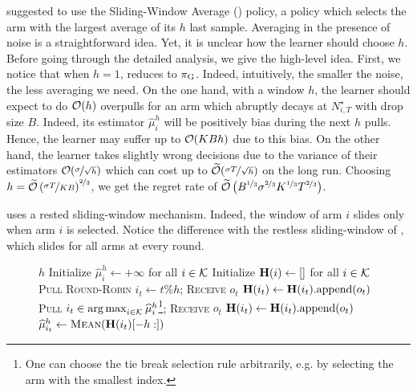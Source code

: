 \citet{levine2017rotting} suggested to use the Sliding-Window Average (\SWA) policy, a policy which selects the arm with the largest average of its $h$ last sample. Averaging in the presence of noise is a straightforward idea. Yet, it is unclear how the learner should choose $h$. Before going through the detailed analysis, we give the high-level idea. First, we notice that when $h=1$, \SWA reduces to $\pi_{\rm G}$. Indeed, intuitively, the smaller the noise, the less averaging we need. On the one hand, with a window $h$, the learner should expect to do $\mathcal{O}(h)$ overpulls for an arm which abruptly decays at $N_{i,T}^\star$ with drop size $B$. Indeed, its estimator $\hat{\mu}_i^h$ will be positively bias during the next $h$ pulls. Hence, the learner may suffer up to $\mathcal{O}(KBh)$ due to this bias. On the other hand, the learner takes slightly wrong decisions due to the variance of their estimators $\mathcal{O}(\nicefrac{\sigma}{\sqrt{h}})$ which can cost up to $\widetilde{\mathcal{O}}(\nicefrac{\sigma T}{\sqrt{h}})$ on the long run. Choosing $h = \widetilde{\mathcal{O}}\left(\nicefrac{ \sigma T}{KB}\right)^{\nicefrac{2}{3}}$, we get the regret rate of $\widetilde{\mathcal{O}}\left(B^{\nicefrac{1}{3}} \sigma^{\nicefrac{2}{3}} K^{\nicefrac{1}{3}} T^{\nicefrac{2}{3}}\right)$. 
\begin{remark}
\SWA uses a rested sliding-window mechanism. Indeed, the window of arm $i$ slides only when arm $i$ is selected. Notice the difference with the restless sliding-window of \SWUCB \citep{garivier2011upper-confidence-bound}, which slides for all arms at every round.
\end{remark}
\begin{figure}[!ht]
\begin{minipage}{\textwidth}
\renewcommand*\footnoterule{}
\begin{savenotes}
\begin{algorithm}[H]
\caption{\SWA \citep{levine2017rotting} }
\label{alg:SWA}
\begin{algorithmic}[1]
\Require $h$
\State Initialize $\hat{\mu}_{i}^h \leftarrow + \infty$ for all $i \in \mathcal{K}$
\State Initialize $\mathbf{H}(i) \leftarrow []$ for all $i \in \mathcal{K}$
	 	\State \textsc{Pull Round-Robin}  $i_t \gets t \% h $; \textsc{Receive} $o_{t}$
	 	\State $\mathbf{H}(i_t) \leftarrow \mathbf{H}(i_t)\text{.append}(o_{t})$
	\EndFor
		\State \textsc{Pull}  $i_t \in \operatorname*{arg\,max}_{i \in \mathcal{K}} \widehat{\mu}_{i}^h$\footnote{One can choose the tie break selection rule arbitrarily, e.g. by selecting the arm with the smallest index.}; \textsc{Receive} $o_{t}$
		\State $\mathbf{H}(i_t) \leftarrow \mathbf{H}(i_t)\text{.append}(o_{t})$
		\State $\widehat{\mu}_{i_t}^h \leftarrow \textsc{Mean}(\mathbf{H}(i_t)[-h:])$
		\EndIf
	\EndFor
\end{algorithmic}
\end{algorithm}
\end{savenotes}
\end{minipage}
\end{figure}
%
